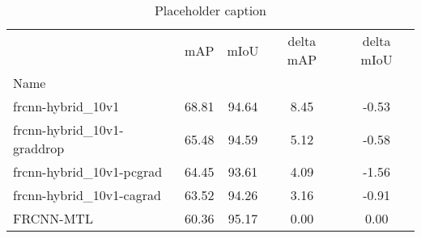 \begin{table}[htbp]
\centering
\caption{Placeholder caption}
\label{tab:constant-grad}
\begin{tabular}{lcccc}
\toprule
 & mAP & mIoU & delta mAP & delta mIoU \\
Name &  &  &  &  \\
\midrule
frcnn-hybrid_10v1 & 68.81 & 94.64 & 8.45 & -0.53 \\
frcnn-hybrid_10v1-graddrop & 65.48 & 94.59 & 5.12 & -0.58 \\
frcnn-hybrid_10v1-pcgrad & 64.45 & 93.61 & 4.09 & -1.56 \\
frcnn-hybrid_10v1-cagrad & 63.52 & 94.26 & 3.16 & -0.91 \\
FRCNN-MTL & 60.36 & 95.17 & 0.00 & 0.00 \\
\bottomrule
\end{tabular}
\end{table}
